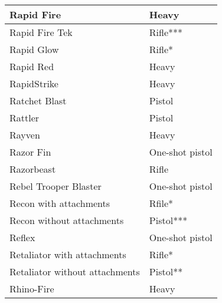 \documentclass{scrbook}
\begin{document}
\begin{table}
\begin{tabular}{|l|l|}
 \hline Rapid Fire & Heavy \\
 \hline Rapid Fire Tek & Rifle*** \\
 \hline Rapid Glow & Rifle* \\
 \hline Rapid Red & Heavy \\
 \hline RapidStrike & Heavy \\
 \hline Ratchet Blast & Pistol \\
 \hline Rattler & Pistol \\
 \hline Rayven & Heavy \\
 \hline Razor Fin & One-shot pistol \\
 \hline Razorbeast & Rifle \\
 \hline Rebel Trooper Blaster & One-shot pistol \\
 \hline Recon with attachments & Rfile* \\
 \hline Recon without attachments & Pistol*** \\
 \hline Reflex & One-shot pistol \\
 \hline Retaliator with attachments & Rifle* \\
 \hline Retaliator without attachments & Pistol** \\
 \hline Rhino-Fire & Heavy \\
 \hline \end{tabular}

\end{table}
\end{document}
